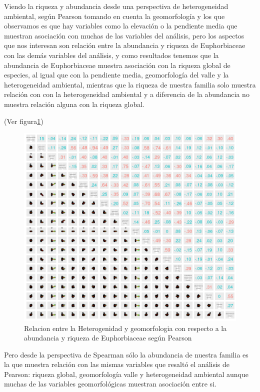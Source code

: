\documentclass[11pt,]{article}
\begin{document}
Viendo la riqueza y abundancia desde una perspectiva de heterogeneidad
ambiental, según Pearson tomando en cuenta la geomorfología y los que
observamos es que hay variables como la elevación o la pendiente media
que muestran asociación con muchas de las variables del análisis, pero
los aspectos que nos interesan son relación entre la abundancia y
riqueza de Euphorbiaceae con las demás variables del análisis, y como
resultados tenemos que la abundancia de Euphorbiaceae muestra asociación
con la riqueza global de especies, al igual que con la pendiente media,
geomorfología del valle y la heterogeneidad ambiental, mientras que la
riqueza de nuestra familia solo muestra relación con con la
heterogeneidad ambiental y a diferencia de la abundancia no muestra
relación alguna con la riqueza global.

(Ver figura\ref{fig:geo_pearson})

\begin{figure}
\centering
\includegraphics{geo_pearson.png}
\caption{\label{fig:geo_pearson} Relacion entre la Heterogenidad y
geomorfologia con respecto a la abundancia y riqueza de Euphorbiaceae
según Pearson}
\end{figure}

Pero desde la perspectiva de Spearman sólo la abundancia de nuestra
familia es la que muestra relación con las mismas variables que resaltó
el análisis de Pearson: riqueza global, geomorfología valle y
heterogeneidad ambiental aunque muchas de las variables geomorfológicas
muestran asociación entre si.
\end{document}
